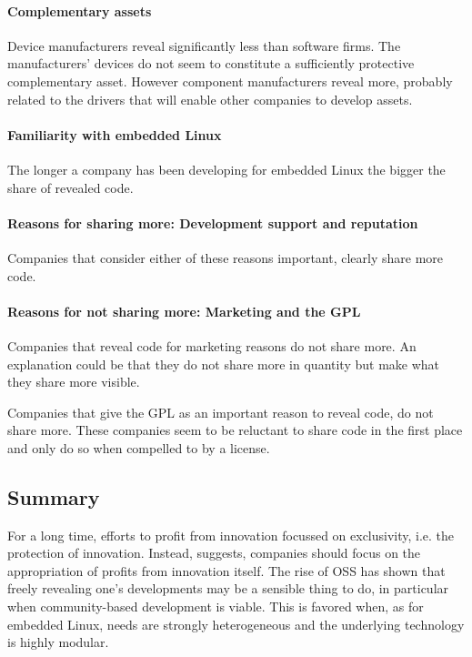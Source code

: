 \documentclass[a4paper]{scrartcl}
\begin{document}
\paragraph{Complementary assets}
Device manufacturers reveal significantly less than software firms.
The manufacturers' devices do not seem to constitute a sufficiently protective complementary asset.
However component manufacturers reveal more, probably related to the drivers that will enable other companies to develop assets.

\paragraph{Familiarity with embedded Linux}
The longer a company has been developing for embedded Linux the bigger the share of revealed code.

\paragraph{Reasons for sharing more: Development support and reputation}
Companies that consider either of these reasons important, clearly share more code.

\paragraph{Reasons for not sharing more: Marketing and the GPL}
Companies that reveal code for marketing reasons do not share more.
An explanation could be that they do not share more in quantity but make what they share more visible.

Companies that give the GPL as an important reason to reveal code, do not share more. 
These companies seem to be reluctant to share code in the first place and only do so when compelled to by a license.


\subsection{Summary}

For a long time, efforts to profit from innovation focussed on exclusivity, i.e. the protection of innovation.
Instead, \citeauthor{henkel2006selective} suggests, companies should focus on the appropriation of profits from innovation itself.
The rise of OSS has shown that freely revealing one’s developments may be a sensible thing to do, in particular when community-based development is viable.
This is favored when, as for embedded Linux, needs are strongly heterogeneous and the underlying technology is highly modular.
\end{document}
